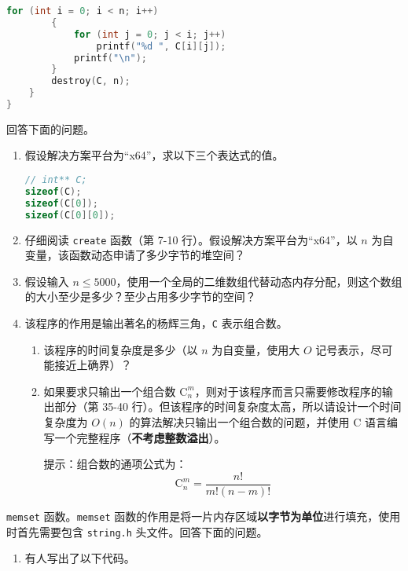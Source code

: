 \begin{problemset}
\begin{lstlisting}[language=c, moreemph={[2]create, destroy, malloc, free}]
		for (int i = 0; i < n; i++)
		{
			for (int j = 0; j < i; j++)
				printf("%d ", C[i][j]);
			printf("\n");
		}
		destroy(C, n);
	}
}
	\end{lstlisting}

	回答下面的问题。

	\begin{enumerate}
		\item 假设解决方案平台为“x64”，求以下三个表达式的值。

		\begin{lstlisting}[language=c, numbers=none]
// int** C;
sizeof(C);
sizeof(C[0]);
sizeof(C[0][0]);
		\end{lstlisting}

		\item 仔细阅读 \lstinline[language=c, moreemph={[2]create}]{create} 函数（第 7-10 行）。假设解决方案平台为“x64”，以 $n$ 为自变量，该函数动态申请了多少字节的堆空间？

		\item 假设输入 $n \le 5000$，使用一个全局的二维数组代替动态内存分配，则这个数组的大小至少是多少？至少占用多少字节的空间？

		\item 该程序的作用是输出著名的杨辉三角，\lstinline{C} 表示组合数。

		\begin{enumerate}
			\item 该程序的时间复杂度是多少（以 $n$ 为自变量，使用大 $O$ 记号表示，尽可能接近上确界）？
			\item 如果要求只输出一个组合数 $\mathrm C_n^m$，则对于该程序而言只需要修改程序的输出部分（第 35-40 行）。但该程序的时间复杂度太高，所以请设计一个时间复杂度为 $O(n)$ 的算法解决只输出一个组合数的问题，并使用 C 语言编写一个完整程序（\textbf{不考虑整数溢出}）。

			提示：组合数的通项公式为：
			$$
			\mathrm C_n^m = \dfrac{n!}{m! (n - m)!}
			$$
		\end{enumerate}
	\end{enumerate}

	\item \lstinline[language=c, moreemph={[2]memset}]{memset} 函数。\lstinline[language=c, moreemph={[2]memset}]{memset} 函数的作用是将一片内存区域\textbf{以字节为单位}进行填充，使用时首先需要包含 \lstinline{string.h} 头文件。回答下面的问题。

	\begin{enumerate}
		\item 有人写出了以下代码。


\end{enumerate}
\end{problemset}
